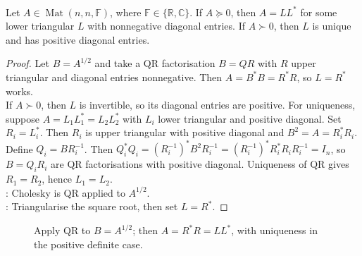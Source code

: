 \begin{theorem} \label{thm:cholesky-factorization} \\
Let $A\in\operatorname{Mat}(n,n,\mathbb{F})$, where $\mathbb{F}\in\{\mathbb{R},\mathbb{C}\}$. If $A\succeq0$, then $A=LL^*$ for some lower triangular $L$ with nonnegative diagonal entries. If $A\succ0$, then $L$ is unique and has positive diagonal entries.
\begin{proof}
Let $B=A^{1/2}$ and take a QR factorisation $B=QR$ with $R$ upper triangular and diagonal entries nonnegative. Then $A=B^*B=R^*R$, so $L=R^*$ works.\\
If $A\succ0$, then $L$ is invertible, so its diagonal entries are positive. For uniqueness, suppose $A=L_1L_1^*=L_2L_2^*$ with $L_i$ lower triangular and positive diagonal. Set $R_i=L_i^*$. Then $R_i$ is upper triangular with positive diagonal and $B^2=A=R_i^*R_i$. Define $Q_i=BR_i^{-1}$. Then $Q_i^*Q_i=(R_i^{-1})^*B^2R_i^{-1}=(R_i^{-1})^*R_i^*R_iR_i^{-1}=I_n$, so $B=Q_iR_i$ are QR factorisations with positive diagonal. Uniqueness of QR gives $R_1=R_2$, hence $L_1=L_2$.\\
: Cholesky is QR applied to $A^{1/2}$.\\
: Triangularise the square root, then set $L=R^*$.
\end{proof}
\end{theorem}

\begin{figure}[H]
  \centering
  
  \caption{Apply QR to $B=A^{1/2}$; then $A=R^*R=LL^*$, with uniqueness in the positive definite case.}
  \label{fig:cholesky-from-qr}
\end{figure}


